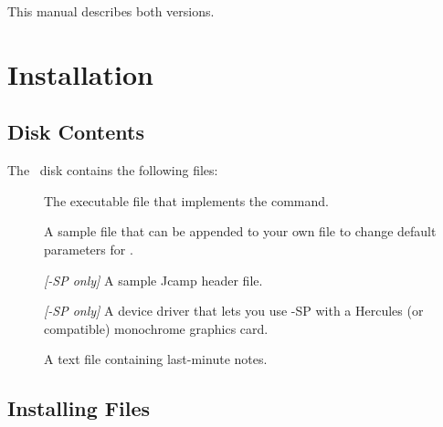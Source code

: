 \noindent This manual describes both versions.
 
 
\chapter{Installation}
 
\section{Disk Contents}
The \RD\ disk contains the following files:
 
\begin{description}
\item[] \nl
The executable file that implements the  command.  
 
\item[] \nl
A sample file that can be appended to your own
 file to change default parameters for \RD.
 
\item[] \nl
{\em [\RD-SP only]} A sample Jcamp header file.

\item[] \nl
{\em [\RD-SP only]} A device driver that lets you use \RD-SP with a
Hercules (or compatible) monochrome graphics card.
 
\item[] \nl
A text file containing last-minute notes.
 
\end{description}
 
\newpage 
\section{Installing Files}

